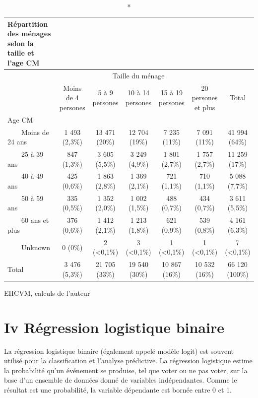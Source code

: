\documentclass[
]{article}
\begin{document}
\setlength{\LTpost}{0mm}
\begin{longtable}{lcccccc}
\caption*{
{\large \textbf{Répartition des ménages
selon la taille et l'age CM}}
} \\ 
\toprule
 & \multicolumn{5}{c}{Taille du ménage} &  \\ 
\cmidrule(lr){2-6}
 & Moins de 4 persones & 5 à 9 persones & 10 à 14 persones & 15 à 19 persones & 20 persones et plus & Total \\ 
\midrule\addlinespace[2.5pt]
Age CM &  &  &  &  &  &  \\ 
    Moins de 24 ans & 1 493 (2,3\%) & 13 471 (20\%) & 12 704 (19\%) & 7 235 (11\%) & 7 091 (11\%) & 41 994 (64\%) \\ 
    25 à 39 ans & 847 (1,3\%) & 3 605 (5,5\%) & 3 249 (4,9\%) & 1 801 (2,7\%) & 1 757 (2,7\%) & 11 259 (17\%) \\ 
    40 à 49 ans & 425 (0,6\%) & 1 863 (2,8\%) & 1 369 (2,1\%) & 721 (1,1\%) & 710 (1,1\%) & 5 088 (7,7\%) \\ 
    50 à 59 ans & 335 (0,5\%) & 1 352 (2,0\%) & 1 002 (1,5\%) & 488 (0,7\%) & 434 (0,7\%) & 3 611 (5,5\%) \\ 
    60 ans et plus & 376 (0,6\%) & 1 412 (2,1\%) & 1 213 (1,8\%) & 621 (0,9\%) & 539 (0,8\%) & 4 161 (6,3\%) \\ 
    Unknown & 0 (0\%) & 2 (<0,1\%) & 3 (<0,1\%) & 1 (<0,1\%) & 1 (<0,1\%) & 7 (<0,1\%) \\ 
Total & 3 476 (5,3\%) & 21 705 (33\%) & 19 540 (30\%) & 10 867 (16\%) & 10 532 (16\%) & 66 120 (100\%) \\ 
\bottomrule
\end{longtable}
\begin{minipage}{\linewidth}
EHCVM, calculs de l'auteur\\
\end{minipage}

\hypertarget{iv-ruxe9gression-logistique-binaire}{%
\section{Iv Régression logistique
binaire}\label{iv-ruxe9gression-logistique-binaire}}

La régression logistique binaire (également appelé modèle logit) est
souvent utilisé pour la classification et l'analyse prédictive. La
régression logistique estime la probabilité qu'un événement se produise,
tel que voter ou ne pas voter, sur la base d'un ensemble de données
donné de variables indépendantes. Comme le résultat est une probabilité,
la variable dépendante est bornée entre 0 et 1.
\end{document}
